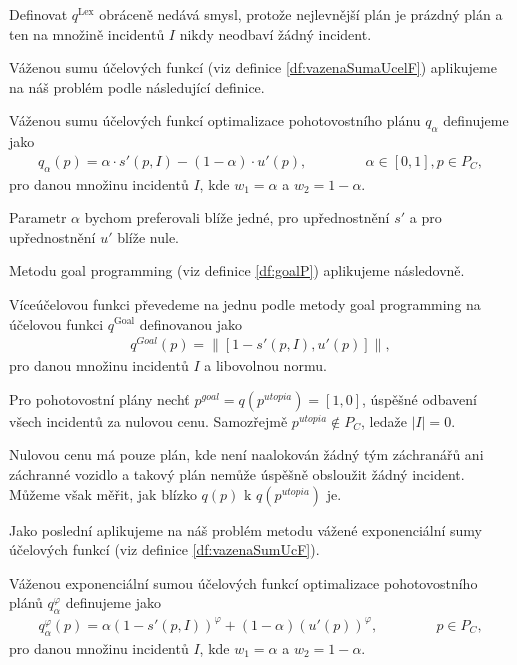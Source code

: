 Definovat $q^{\text{Lex}}$ obráceně nedává smysl, protože nejlevnější plán je prázdný plán a ten na množině incidentů $I$ nikdy neodbaví žádný incident.

Váženou sumu účelových funkcí (viz definice \ref{df:vazenaSumaUcelF}) aplikujeme na náš problém podle následující definice. 
\begin{definice}\label{df:vazenaSumaPohotovost}
  Váženou sumu účelových funkcí optimalizace pohotovostního plánu $q_{\alpha}$ definujeme jako
  \begin{align*}
    q_{\alpha}(p) = \alpha \cdot s'(p, I) - (1 - \alpha) \cdot u'(p), \hspace{50pt} \alpha \in [0, 1], p \in P_C,
  \end{align*}
  pro danou množinu incidentů $I$, kde $w_1 = \alpha$ a $w_2 = 1 - \alpha$.
\end{definice}

Parametr $\alpha$ bychom preferovali blíže jedné, pro upřednostnění $s'$ a pro upřednostnění $u'$ blíže nule.

Metodu goal programming (viz definice \ref{df:goalP}) aplikujeme následovně.
\begin{definice}
  Víceúčelovou funkci převedeme na jednu podle metody goal programming na účelovou funkci $q^{\text{Goal}}$ definovanou jako
  \begin{align*}
    q^{Goal}(p) = \| [1 - s'(p, I), u'(p)] \|,
  \end{align*}
  pro danou množinu incidentů $I$ a libovolnou normu.
\end{definice}

Pro pohotovostní plány nechť $p^{goal} = q(p^{utopia}) = [1, 0]$, úspěšné odbavení všech incidentů za nulovou cenu.
Samozřejmě $p^{utopia} \not \in P_C$, ledaže $|I| = 0$.

Nulovou cenu má pouze plán, kde není naalokován žádný tým záchranářů ani záchranné vozidlo a takový plán nemůže úspěšně obsloužit žádný incident. 
Můžeme však měřit, jak blízko $q(p)$ k $q(p^{utopia})$ je.

Jako poslední aplikujeme na náš problém metodu vážené exponenciální sumy účelových funkcí (viz definice \ref{df:vazenaSumUcF}).
\begin{definice}\label{df:vazenaSumaExpPohotovost}
  Váženou exponenciální sumou účelových funkcí optimalizace pohotovostního plánů $q_{\alpha}^{\varphi}$ definujeme jako 
  \begin{align*}
    q_{\alpha}^{\varphi}(p) = \alpha (1 - s'(p, I))^\varphi + (1 - \alpha)(u'(p))^\varphi, \hspace{50pt} p \in P_C,
  \end{align*}
  pro danou množinu incidentů $I$, kde $w_1 = \alpha$ a $w_2 = 1 - \alpha$.
\end{definice}

